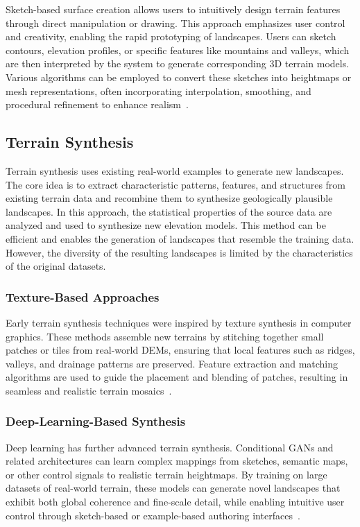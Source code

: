 Sketch-based surface creation allows users to intuitively design terrain features through direct manipulation or drawing. This approach emphasizes user control and creativity, enabling the rapid prototyping of landscapes. Users can sketch contours, elevation profiles, or specific features like mountains and valleys, which are then interpreted by the system to generate corresponding 3D terrain models. Various algorithms can be employed to convert these sketches into heightmaps or mesh representations, often incorporating interpolation, smoothing, and procedural refinement to enhance realism~\cite{Gain2009}.

\subsection{Terrain Synthesis}
\label{subsec:terrain_synthesis}

Terrain synthesis uses existing real-world examples to generate new landscapes. The core idea is to extract characteristic patterns, features, and structures from existing terrain data and recombine them to synthesize geologically plausible landscapes. In this approach, the statistical properties of the source data are analyzed and used to synthesize new elevation models. This method can be efficient and enables the generation of landscapes that resemble the training data. However, the diversity of the resulting landscapes is limited by the characteristics of the original datasets.

\subsubsection{Texture-Based Approaches}

Early terrain synthesis techniques were inspired by texture synthesis in computer graphics. These methods assemble new terrains by stitching together small patches or tiles from real-world DEMs, ensuring that local features such as ridges, valleys, and drainage patterns are preserved. Feature extraction and matching algorithms are used to guide the placement and blending of patches, resulting in seamless and realistic terrain mosaics~\cite{zhou2007terrain}.

\subsubsection{Deep-Learning-Based Synthesis}

Deep learning has further advanced terrain synthesis. Conditional GANs and related architectures can learn complex mappings from sketches, semantic maps, or other control signals to realistic terrain heightmaps. By training on large datasets of real-world terrain, these models can generate novel landscapes that exhibit both global coherence and fine-scale detail, while enabling intuitive user control through sketch-based or example-based authoring interfaces~\cite{Guerin2017}.

